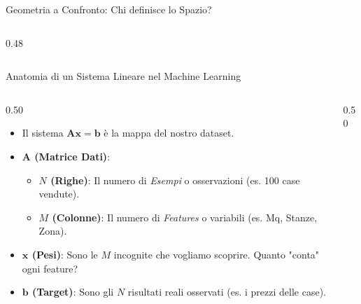 \documentclass[aspectratio=169, 10pt]{beamer}
\begin{document}
\begin{frame}{Geometria a Confronto: Chi definisce lo Spazio?}
\begin{columns}[T,onlytextwidth]
\begin{column}{0.48\textwidth}
            
        \end{column}
    \end{columns}
\end{frame}

\begin{frame}{Anatomia di un Sistema Lineare nel Machine Learning}
    \begin{columns}[T]
        \begin{column}{0.50\textwidth}
            \small
            \vspace{0.2cm}
            \begin{itemize}
                \setlength\itemsep{1.2em}
                \item Il sistema $\mathbf{A}\mathbf{x} = \mathbf{b}$ è la mappa del nostro dataset.
                
                \item \textbf{$\mathbf{A}$ (Matrice Dati)}:
                \begin{itemize}
                    \item \textbf{$N$ (Righe)}: Il numero di \textit{Esempi} o osservazioni (es. 100 case vendute).
                    \item \textbf{$M$ (Colonne)}: Il numero di \textit{Features} o variabili (es. Mq, Stanze, Zona).
                \end{itemize}
                
                \item \textbf{$\mathbf{x}$ (Pesi)}:
                Sono le $M$ incognite che vogliamo scoprire. Quanto "conta" ogni feature?
                
                \item \textbf{$\mathbf{b}$ (Target)}:
                Sono gli $N$ risultati reali osservati (es. i prezzi delle case).
            \end{itemize}
        \end{column}
        
        \begin{column}{0.50\textwidth}
            \centering
            \begin{tikzpicture}[scale=0.8, transform shape]
                

\end{tikzpicture}
\end{column}
\end{columns}
\end{frame}
\end{document}
